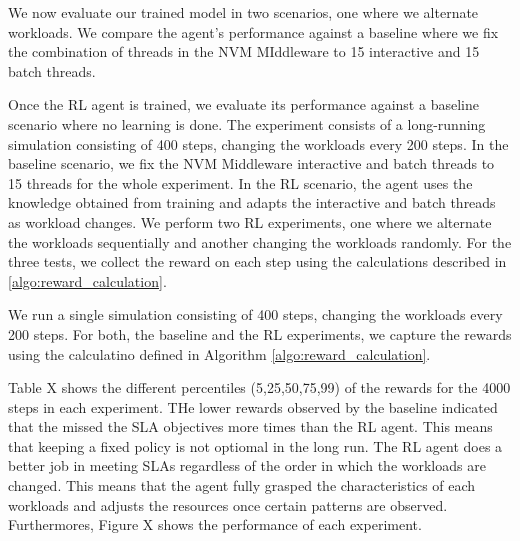 We now evaluate our trained model in two scenarios, one where we alternate workloads. We compare the agent's performance against a baseline where we fix the combination of threads in the NVM MIddleware to 15 interactive and 15 batch threads.

Once the RL agent is trained, we evaluate its performance against a baseline scenario where no learning is done. The experiment consists of a long-running simulation consisting of 400 steps, changing the workloads every 200 steps. In the baseline scenario, we fix the NVM Middleware interactive and batch threads to 15 threads for the whole experiment. In the RL scenario, the agent uses the knowledge obtained from training and adapts the interactive and batch threads as workload changes. We perform two RL experiments, one where we alternate the workloads sequentially and another changing the workloads randomly. For the three tests, we collect the reward on each step using the calculations described in \ref{algo:reward_calculation}.

We run a single simulation consisting of 400 steps, changing the workloads every 200 steps. For both, the baseline and the RL experiments, we capture the rewards using the calculatino defined in Algorithm \ref{algo:reward_calculation}.

Table X shows the different percentiles (5,25,50,75,99) of the rewards for the 4000 steps in each experiment. THe lower rewards observed by the baseline indicated that the missed the SLA objectives more times than the RL agent. This means that keeping a fixed policy is not optiomal in the long run. The RL agent does a better job in meeting SLAs regardless of the order in which the workloads are changed. This means that the agent fully grasped the characteristics of each workloads and adjusts the resources once certain patterns are observed. Furthermores, Figure X shows the performance of each experiment.
